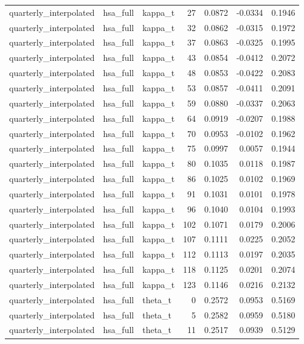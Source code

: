 \begin{tabular}{lllrrrr}
quarterly\_interpolated & hsa\_full & kappa\_t & 27 & 0.0872 & -0.0334 & 0.1946 \\
quarterly\_interpolated & hsa\_full & kappa\_t & 32 & 0.0862 & -0.0315 & 0.1972 \\
quarterly\_interpolated & hsa\_full & kappa\_t & 37 & 0.0863 & -0.0325 & 0.1995 \\
quarterly\_interpolated & hsa\_full & kappa\_t & 43 & 0.0854 & -0.0412 & 0.2072 \\
quarterly\_interpolated & hsa\_full & kappa\_t & 48 & 0.0853 & -0.0422 & 0.2083 \\
quarterly\_interpolated & hsa\_full & kappa\_t & 53 & 0.0857 & -0.0411 & 0.2091 \\
quarterly\_interpolated & hsa\_full & kappa\_t & 59 & 0.0880 & -0.0337 & 0.2063 \\
quarterly\_interpolated & hsa\_full & kappa\_t & 64 & 0.0919 & -0.0207 & 0.1988 \\
quarterly\_interpolated & hsa\_full & kappa\_t & 70 & 0.0953 & -0.0102 & 0.1962 \\
quarterly\_interpolated & hsa\_full & kappa\_t & 75 & 0.0997 & 0.0057 & 0.1944 \\
quarterly\_interpolated & hsa\_full & kappa\_t & 80 & 0.1035 & 0.0118 & 0.1987 \\
quarterly\_interpolated & hsa\_full & kappa\_t & 86 & 0.1025 & 0.0102 & 0.1969 \\
quarterly\_interpolated & hsa\_full & kappa\_t & 91 & 0.1031 & 0.0101 & 0.1978 \\
quarterly\_interpolated & hsa\_full & kappa\_t & 96 & 0.1040 & 0.0104 & 0.1993 \\
quarterly\_interpolated & hsa\_full & kappa\_t & 102 & 0.1071 & 0.0179 & 0.2006 \\
quarterly\_interpolated & hsa\_full & kappa\_t & 107 & 0.1111 & 0.0225 & 0.2052 \\
quarterly\_interpolated & hsa\_full & kappa\_t & 112 & 0.1113 & 0.0197 & 0.2035 \\
quarterly\_interpolated & hsa\_full & kappa\_t & 118 & 0.1125 & 0.0201 & 0.2074 \\
quarterly\_interpolated & hsa\_full & kappa\_t & 123 & 0.1146 & 0.0216 & 0.2132 \\
quarterly\_interpolated & hsa\_full & theta\_t & 0 & 0.2572 & 0.0953 & 0.5169 \\
quarterly\_interpolated & hsa\_full & theta\_t & 5 & 0.2582 & 0.0959 & 0.5180 \\
quarterly\_interpolated & hsa\_full & theta\_t & 11 & 0.2517 & 0.0939 & 0.5129 \\

\end{tabular}
